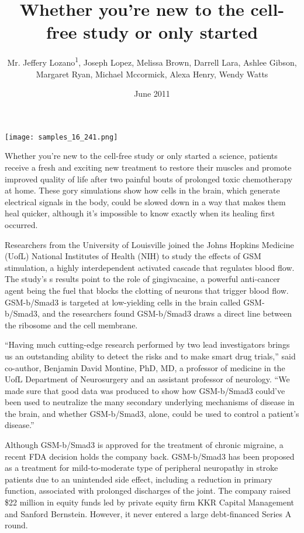 \documentclass{article}
\title{Whether you’re new to the cell-free study or only started}
\author{Mr. Jeffery Lozano\textsuperscript{1},  Joseph Lopez,  Melissa Brown,  Darrell Lara,  Ashlee Gibson,  Margaret Ryan,  Michael Mccormick,  Alexa Henry,  Wendy Watts}
\affil{\textsuperscript{1}Delhi State Cancer Institute}
\date{June 2011}
\begin{document}
\maketitle

\begin{center}
\begin{minipage}{0.75\linewidth}
\texttt{[image: samples\_16\_241.png]}
\end{minipage}
\end{center}

Whether you’re new to the cell-free study or only started a science, patients receive a fresh and exciting new treatment to restore their muscles and promote improved quality of life after two painful bouts of prolonged toxic chemotherapy at home. These gory simulations show how cells in the brain, which generate electrical signals in the body, could be slowed down in a way that makes them heal quicker, although it’s impossible to know exactly when its healing first occurred.

Researchers from the University of Louisville joined the Johns Hopkins Medicine (UofL) National Institutes of Health (NIH) to study the effects of GSM stimulation, a highly interdependent activated cascade that regulates blood flow. The study’s s results point to the role of gingivacaine, a powerful anti-cancer agent being the fuel that blocks the clotting of neurons that trigger blood flow. GSM-b/Smad3 is targeted at low-yielding cells in the brain called GSM-b/Smad3, and the researchers found GSM-b/Smad3 draws a direct line between the ribosome and the cell membrane.

“Having much cutting-edge research performed by two lead investigators brings us an outstanding ability to detect the risks and to make smart drug trials,” said co-author, Benjamin David Montine, PhD, MD, a professor of medicine in the UofL Department of Neurosurgery and an assistant professor of neurology. “We made sure that good data was produced to show how GSM-b/Smad3 could’ve been used to neutralize the many secondary underlying mechanisms of disease in the brain, and whether GSM-b/Smad3, alone, could be used to control a patient’s disease.”

Although GSM-b/Smad3 is approved for the treatment of chronic migraine, a recent FDA decision holds the company back. GSM-b/Smad3 has been proposed as a treatment for mild-to-moderate type of peripheral neuropathy in stroke patients due to an unintended side effect, including a reduction in primary function, associated with prolonged discharges of the joint. The company raised \$22 million in equity funds led by private equity firm KKR Capital Management and Sanford Bernstein. However, it never entered a large debt-financed Series A round.
\end{document}
